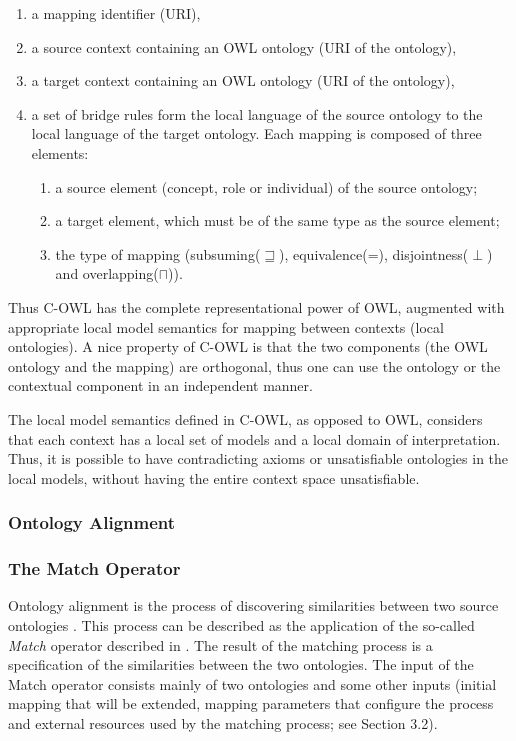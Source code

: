 \begin{enumerate}
\item a mapping identifier (URI), 
\item a source context containing an OWL ontology (URI of the ontology),

\item a target context containing an OWL ontology (URI of the ontology),

\item a set of bridge rules form the local language of the source
ontology to the local language of the target ontology. Each mapping is
composed of three elements: 

\begin{enumerate}
\item a source element (concept, role or individual) of the source
ontology; 
\item a target element, which must be of the same type as the source
element; 
\item the type of mapping (subsuming($\sqsupseteq$), equivalence(=), disjointness($\perp$) and
overlapping($\sqcap$)). 
\end{enumerate}
\end{enumerate}
Thus C-OWL has the complete representational power of OWL, augmented
with appropriate local model semantics for mapping between contexts
(local ontologies). A nice property of C-OWL is that the two components
(the OWL ontology and the mapping) are orthogonal, thus one can use the
ontology or the contextual component in an independent manner. 

The local model semantics defined in C-OWL, as opposed to OWL, considers
that each context has a local set of models and a local domain of
interpretation. Thus, it is possible to have contradicting axioms or
unsatisfiable ontologies in the local models, without having the entire
context space unsatisfiable. 

\subsubsection{Ontology Alignment}
\label{subsec:mediationapproaches_ontologyalignment}
\subsubsection{The Match Operator}
Ontology alignment is the process of discovering similarities between
two source ontologies \cite{debruin2005wsml}. This process can be
described as the application of the so-called \textit{Match} operator
described in \cite{rahm01survey}. The result of the matching
process is a specification of the similarities between the two
ontologies. The input of the Match operator consists mainly of two
ontologies and some other inputs (initial mapping that will be
extended, mapping parameters that configure the process and external
resources used by the matching process; see Section 3.2). 


